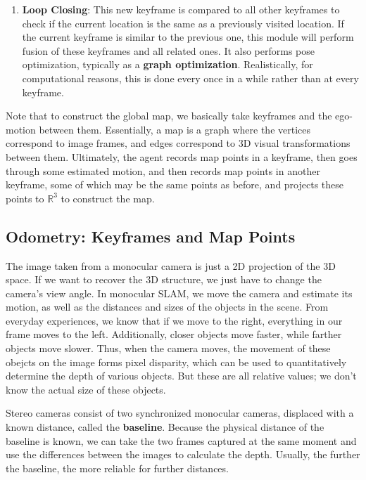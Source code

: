 \documentclass{article}
\begin{document}
\begin{enumerate}
      \item \textbf{Loop Closing}: This new keyframe is compared to all other keyframes to check if the current location is the same as a previously visited location. If the current keyframe is similar to the previous one, this module will perform fusion of these keyframes and all related ones. It also performs pose optimization, typically as a \textbf{graph optimization}. Realistically, for computational reasons, this is done every once in a while rather than at every keyframe. 
  \end{enumerate}
  Note that to construct the global map, we basically take keyframes and the ego-motion between them. Essentially, a map is a graph where the vertices correspond to image frames, and edges correspond to 3D visual transformations between them. Ultimately, the agent records map points in a keyframe, then goes through some estimated motion, and then records map points in another keyframe, some of which may be the same points as before, and projects these points to $\mathbb{R}^3$ to construct the map. 

  \subsection{Odometry: Keyframes and Map Points}

  The image taken from a monocular camera is just a 2D projection of the 3D space. If we want to recover the 3D structure, we just have to change the camera's view angle. In monocular SLAM, we move the camera and estimate its motion, as well as the distances and sizes of the objects in the scene. From everyday experiences, we know that if we move to the right, everything in our frame moves to the left. Additionally, closer objects move faster, while farther objects move slower. Thus, when the camera moves, the movement of these obejcts on the image forms pixel disparity, which can be used to quantitatively determine the depth of various objects. But these are all relative values; we don't know the actual size of these objects. 

  Stereo cameras consist of two synchronized monocular cameras, displaced with a known distance, called the \textbf{baseline}. Because the physical distance of the baseline is known, we can take the two frames captured at the same moment and use the differences between the images to calculate the depth. Usually, the further the baseline, the more reliable for further distances. 
\end{document}

